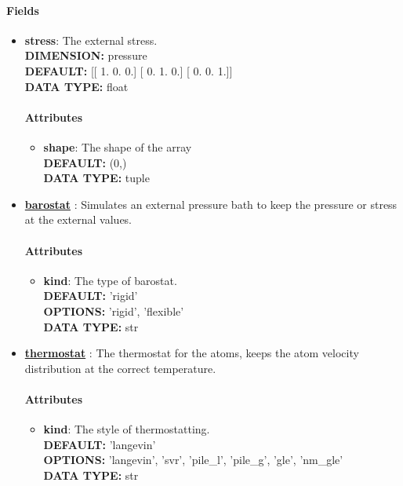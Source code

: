 \paragraph{Fields}
 \begin{itemize}
\item {\bf stress}:
 The external stress.
{\\ \bf DIMENSION: }pressure
{\\ \bf DEFAULT: }
      [[ 1.  0.  0.]
       [ 0.  1.  0.]
       [ 0.  0.  1.]]
{\\ \bf DATA TYPE: }float
\paragraph{Attributes}
 \begin{itemize}
\item {\bf shape}:
 The shape of the array
{\\ \bf DEFAULT: }(0,)
{\\ \bf DATA TYPE: }tuple
\end{itemize}
 
\item {\bf \hyperref[BAROSTAT]{barostat} }:
 Simulates an external pressure bath to keep the pressure or stress at the external values.
\paragraph{Attributes}
 \begin{itemize}
\item {\bf kind}:
 The type of barostat.
{\\ \bf DEFAULT: }'rigid'
{\\ \bf OPTIONS: }'rigid', 'flexible'
{\\ \bf DATA TYPE: }str
\end{itemize}
 
\item {\bf \hyperref[THERMOSTATS]{thermostat} }:
 The thermostat for the atoms, keeps the atom velocity distribution at the correct temperature.
\paragraph{Attributes}
 \begin{itemize}
\item {\bf kind}:
 The style of thermostatting.
{\\ \bf DEFAULT: }'langevin'
{\\ \bf OPTIONS: }'langevin', 'svr', 'pile\_l', 'pile\_g', 'gle', 'nm\_gle'
{\\ \bf DATA TYPE: }str
\end{itemize}
 

\end{itemize}
